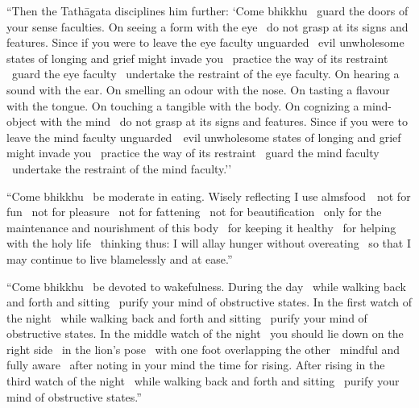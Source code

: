 \suttaRef{[MN 51]}

\begin{english-only-justify}
  ``Then the Tathāgata disciplines him further: `Come bhikkhu \breathmark\ guard the doors of your sense faculties. On seeing a form with the eye \breathmark\ do not grasp at its signs and features. Since if you were to leave the eye faculty unguarded \breathmark\ evil unwholesome states of longing and grief might invade you \breathmark\ practice the way of its restraint \breathmark\ guard the eye faculty \breathmark\ undertake the restraint of the eye faculty. On hearing a sound with the ear. On smelling an odour with the nose. On tasting a flavour with the tongue. On touching a tangible with the body. On cognizing a mind-object with the mind \breathmark\ do not grasp at its signs and features. Since if you were to leave the mind faculty \mbox{unguarded}~\breathmark\ evil unwholesome states of longing and grief might invade you \breathmark\ practice the way of its restraint \breathmark\ guard the mind faculty \breathmark\ undertake the restraint of the mind faculty.''
\end{english-only-justify}

\begin{english-only-justify}
  ``Come bhikkhu \breathmark\ be moderate in eating. Wisely reflecting I use \mbox{almsfood}~\breathmark\ not for fun \breathmark\ not for pleasure \breathmark\ not for fattening \breathmark\ not for beautification \breathmark\ only for the maintenance and nourishment of this body \breathmark\ for keeping it healthy \breathmark\ for helping with the holy life \breathmark\ thinking thus: I will allay hunger without overeating \breathmark\ so that I may continue to live blamelessly and at ease.''
\end{english-only-justify}

\begin{english-only-justify}
  ``Come bhikkhu \breathmark\ be devoted to wakefulness. During the day \breathmark\ while walking back and forth and sitting \breathmark\ purify your mind of obstructive states. In the first watch of the night \breathmark\ while walking back and forth and sitting \breathmark\ purify your mind of obstructive states. In the middle watch of the night \breathmark\ you should lie down on the right side \breathmark\ in the lion's pose \breathmark\ with one foot overlapping the other \breathmark\ mindful and fully aware \breathmark\ after noting in your mind the time for rising. After rising in the third watch of the night \breathmark\ while walking back and forth and sitting \breathmark\ purify your mind of obstructive states.''
\end{english-only-justify}

